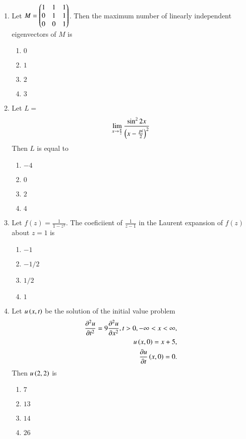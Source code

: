 \documentclass[journal]{IEEEtran}
\begin{document}
\begin{enumerate}
    \item Let $M = \begin{pmatrix}1&1&1\\0&1&1\\0&0&1\end{pmatrix}$. Then the maximum number of linearly independent eigenvectors of $M$ is
        \begin{enumerate}
            \item $0$
            \item $1$
            \item $2$
            \item $3$
        \end{enumerate}

    \item Let $L =$ $$\lim_{x \to \frac{\pi}{2}} \frac{\sin ^ 2 2x}{\left(x - \frac{pi}{2}\right)^2}$$ Then $L$ is equal to
        \begin{enumerate}
            \item $-4$
            \item $0$
            \item $2$
            \item $4$
        \end{enumerate}

    \item Let $f(z) = \frac{1}{1-z^2}$. The coeficiient of $\frac{1}{z-1}$ in the Laurent expansion of $f(z)$ about $z=1$ is
        \begin{enumerate}
            \item $-1$
            \item $-1/2$
            \item $1/2$
            \item $1$
        \end{enumerate}

    \item Let $u\left(x,t\right)$ be the solution of the initial value problem 
    \begin{align*}
        \frac{\partial ^ 2 u}{\partial t^2} = 9 \frac{\partial ^ 2 u}{\partial x^2}, t>0, - \infty < x< \infty,\\
        u\left(x,0\right) = x+5,\\
        \frac{\partial u}{\partial t}\left(x,0\right) = 0.
    \end{align*}
    Then $u\left(2,2\right)$ is 
        \begin{enumerate}
            \item $7$
            \item $13$
            \item $14$
            \item $26$
        \end{enumerate}


\end{enumerate}
\end{document}
